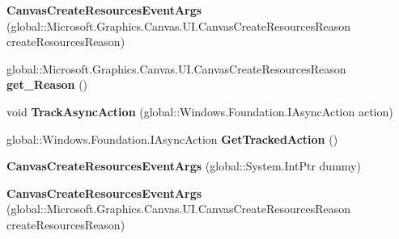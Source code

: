 \begin{DoxyCompactItemize}
{\bfseries Canvas\+Create\+Resources\+Event\+Args} (global\+::\+Microsoft.\+Graphics.\+Canvas.\+U\+I.\+Canvas\+Create\+Resources\+Reason create\+Resources\+Reason)
\item 
\mbox{\label{class_microsoft_1_1_graphics_1_1_canvas_1_1_u_i_1_1_canvas_create_resources_event_args_ac34effc43e4224c4a19ddd6ff7883c3d}} 
global\+::\+Microsoft.\+Graphics.\+Canvas.\+U\+I.\+Canvas\+Create\+Resources\+Reason {\bfseries get\+\_\+\+Reason} ()
\item 
\mbox{\label{class_microsoft_1_1_graphics_1_1_canvas_1_1_u_i_1_1_canvas_create_resources_event_args_af4082e3d50efdfe88607e77abbf80871}} 
void {\bfseries Track\+Async\+Action} (global\+::\+Windows.\+Foundation.\+I\+Async\+Action action)
\item 
\mbox{\label{class_microsoft_1_1_graphics_1_1_canvas_1_1_u_i_1_1_canvas_create_resources_event_args_adc12f96f4bcb8711da14472092a38891}} 
global\+::\+Windows.\+Foundation.\+I\+Async\+Action {\bfseries Get\+Tracked\+Action} ()
\item 
\mbox{\label{class_microsoft_1_1_graphics_1_1_canvas_1_1_u_i_1_1_canvas_create_resources_event_args_ae98b263ce96e012c6c79fb507af1887e}} 
{\bfseries Canvas\+Create\+Resources\+Event\+Args} (global\+::\+System.\+Int\+Ptr dummy)
\item 
\mbox{\label{class_microsoft_1_1_graphics_1_1_canvas_1_1_u_i_1_1_canvas_create_resources_event_args_a82b174b6991b45dae81601265385770c}} 
{\bfseries Canvas\+Create\+Resources\+Event\+Args} (global\+::\+Microsoft.\+Graphics.\+Canvas.\+U\+I.\+Canvas\+Create\+Resources\+Reason create\+Resources\+Reason)
\item 
\mbox{\label{class_microsoft_1_1_graphics_1_1_canvas_1_1_u_i_1_1_canvas_create_resources_event_args_ac34effc43e4224c4a19ddd6ff7883c3d}} 

\end{DoxyCompactItemize}
